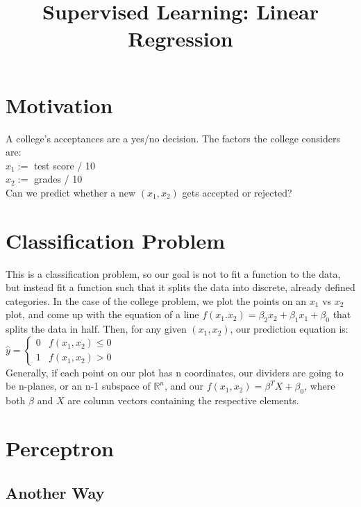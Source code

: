 \documentclass{article}
\title{Supervised Learning: Linear Regression}
\begin{document}
\maketitle
\section{Motivation}
A college's acceptances are a yes/no decision. The factors the college considers are:\\
$x_1:=$ test score / 10\\
$x_2:=$ grades / 10\\

Can we predict whether a new $(x_1, x_2)$ gets accepted or rejected?

\section{Classification Problem}
This is a classification problem, so our goal is not to fit a function to the data, but instead fit a function such that it splits the data into discrete, already defined categories. In the case of the college problem, we plot the points on an $x_1$ vs $x_2$ plot, and come up with the equation of a line $f(x_1.x_2) = \beta_2 x_2 + \beta_1 x_1 + \beta_0$ that splits the data in half. Then, for any given $(x_1,x_2)$, our prediction equation is: \\
$\hat{y} = 
\begin{cases} 
0 & f(x_1, x_2) \le 0 \\
1 & f(x_1, x_2) > 0 
\end{cases}
$\\
Generally, if each point on our plot has n coordinates, our dividers are going to be n-planes, or an n-1 subspace of $\mathbb{R}^n$, and our $f(x_1, x_2) = \beta^T X + \beta_0$, where both $\beta$ and $X$ are column vectors containing the respective elements.
\section{Perceptron}

\subsection{Another Way}
\end{document}
